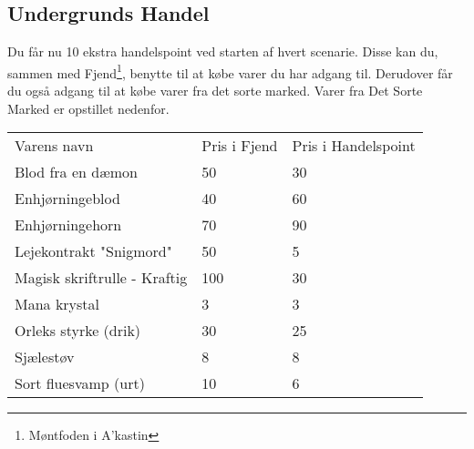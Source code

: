 \subsection{Undergrunds Handel}
Du får nu 10 ekstra handelspoint ved starten af hvert scenarie. Disse kan du, sammen med Fjend\footnote{Møntfoden i A'kastin}, benytte til at købe varer du har adgang til. Derudover får du også adgang til at købe varer fra det sorte marked. Varer fra Det Sorte Marked er opstillet nedenfor.
\begin{table}[H]
    \centering
    \begin{tabular}{|p{}|p{}|p{}|}
    \hline
    \rowcolor{cerulean!80}
    \multicolumn{3}{c}{Det Sorte Marked}\\
    \hline
    \rowcolor{cerulean!40}
         Varens navn & Pris i Fjend & Pris i Handelspoint \\\hline
         Blod fra en dæmon & 50 & 30\\\hline
         Enhjørningeblod & 40 & 60 \\\hline
         Enhjørningehorn & 70 & 90 \\\hline
         Lejekontrakt "Snigmord" & 50 & 5\\\hline
         Magisk skriftrulle - Kraftig& 100 & 30\\\hline
         Mana krystal & 3 & 3\\\hline
         Orleks styrke (drik) & 30 & 25\\\hline
         Sjælestøv & 8 & 8\\\hline
         Sort fluesvamp (urt) & 10 & 6\\\hline
    \end{tabular}
    \end{table}